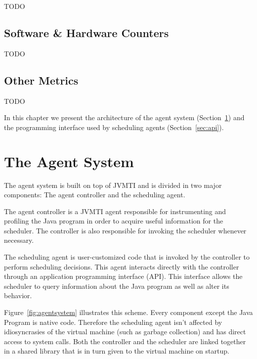 TODO

\subsection{Software \& Hardware Counters}

TODO

\subsection{Other Metrics}


TODO

\iffalse
In this chapter we present the architecture of the agent system (Section~\ref{sec:agentsystem}) and the programming interface used by scheduling agents (Section~\ref{sec:api}).

\section{The Agent System} \label{sec:agentsystem}

The agent system is built on top of JVMTI and is divided in two major components: The agent controller and the scheduling agent.

The agent controller is a JVMTI agent responsible for instrumenting and profiling the Java program in order to acquire useful information for the scheduler. The controller is also responsible for invoking the scheduler whenever necessary.

The scheduling agent is user-customized code that is invoked by the controller to perform scheduling decisions. This agent interacts directly with the controller through an application programming interface (API). This interface allows the scheduler to query information about the Java program as well as alter its behavior.

Figure~\ref{fig:agentsystem} illustrates this scheme. Every component except the Java Program is native code. Therefore the scheduling agent isn't affected by idiosyncrasies of the virtual machine (such as garbage collection) and has direct access to system calls. Both the controller and the scheduler are linked together in a shared library that is in turn given to the virtual machine on startup.

